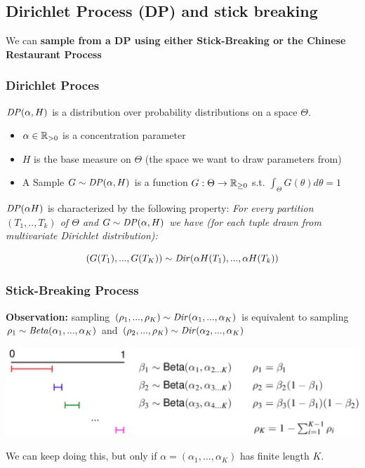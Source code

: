 \subsection{Dirichlet Process (DP) and stick breaking}
We can \textbf{sample from a DP using either Stick-Breaking or the Chinese Restaurant Process}

\subsubsection{Dirichlet Proces}
$\mathit{DP}(\alpha, H)$ is a distribution over probability distributions on a space $\Theta$.
\begin{itemize}
	\item $\alpha\in\mathbb R_{>0}$ is a concentration parameter
	\item $H$ is the base measure on $\Theta$ (the space we want to draw parameters from)
	\item A Sample $G\sim\mathit{DP}(\alpha, H)$ is a function $G:\Theta\to\mathbb R_{\geq 0}$ s.t. $\int_\Theta G(\theta)d\theta=1$
\end{itemize}

\begin{minipage}{\columnwidth}
$\mathit{DP}(\alpha H)$ is characterized by the following property: \textit{For every partition $(T_1, .., T_k)$ of $\Theta$ and $G\sim \mathit{DP}(\alpha, H)$ we have (for each tuple drawn from multivariate Dirichlet distribution): }

$$
	(G(T_1), ..., G(T_K))\sim \mathit{Dir}(\alpha H(T_1), ..., \alpha H(T_k))
$$
\end{minipage}

\subsubsection{Stick-Breaking Process}
\textbf{Observation: } sampling $(\rho_1, ..., \rho_K) \sim \mathit{Dir}(\alpha_1, ..., \alpha_K)$ is equivalent to sampling $\rho_1 \sim \mathit{Beta}(\alpha_1, ..., \alpha_K)$ and $(\rho_2, ..., \rho_K) \sim \mathit{Dir}(\alpha_2, ..., \alpha_K)$

\begin{center}
	\includegraphics[width = 0.8\columnwidth]{images/12b-stick-breaking-1}
\end{center}
We can keep doing this, but only if $\alpha = (\alpha_1, ..., \alpha_K)$ has finite length $K$.

